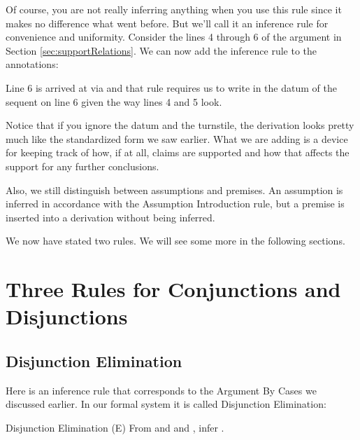 Of course, you are not really inferring anything when you use this rule since it 
makes no difference what went before. But we'll call it an inference rule for 
convenience and uniformity. Consider the lines 4 through 6 of the argument in 
Section \ref{sec:supportRelations}. We can now add the inference rule to the 
annotations:

\begin{argumentN}[4]

 \aitem {}

 \aitem {}

 \aitem {}

\end{argumentN}

Line 6 is arrived at via \condE{} and that rule requires us to write  
in the datum of the sequent on line 6 given the way lines 4 and 5 look.

Notice that if you ignore the datum and the turnstile, the derivation looks 
pretty much like the standardized form we saw earlier. What we are adding is a 
device for keeping track of how, if at all, claims are supported and how that 
affects the support for any further conclusions. 

Also, we still distinguish between assumptions and premises. An assumption is 
inferred in accordance with the Assumption Introduction rule, but a premise is 
inserted into a derivation without being inferred. 



We now have stated two rules. We will see some more in the following sections.




\section{Three Rules for Conjunctions and Disjunctions}\label{sec:conj_disj}


\subsection{Disjunction Elimination}

Here is an inference rule that corresponds to the Argument By Cases we discussed 
earlier.  In our formal system it is called Disjunction Elimination:

\begin{infrule}
 \item[Disjunction Elimination (\p{\lor}E)] From  
  and
   and , infer .

\end{infrule}


